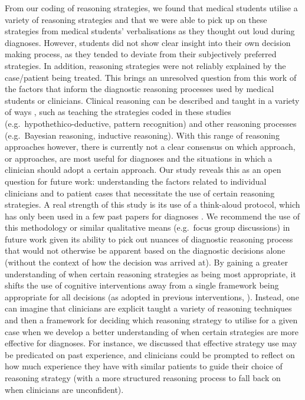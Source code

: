 \documentclass[a4paper, nobind]{templates/ociamthesis}
\begin{document}
From our coding of reasoning strategies, we found that medical students utilise a variety of reasoning strategies and that we were able to pick up on these strategies from medical students' verbalisations as they thought out loud during diagnoses. However, students did not show clear insight into their own decision making process, as they tended to deviate from their subjectively preferred strategies. In addition, reasoning strategies were not reliably explained by the case/patient being treated. This brings an unresolved question from this work of the factors that inform the diagnostic reasoning processes used by medical students or clinicians. Clinical reasoning can be described and taught in a variety of ways \autocite{royce_teaching_2019}, such as teaching the strategies coded in these studies (e.g.~hypothethico-deductive, pattern recognition) and other reasoning processes (e.g.~Bayesian reasoning, inductive reasoning). With this range of reasoning approaches however, there is currently not a clear consensus on which approach, or approaches, are most useful for diagnoses and the situations in which a clinician should adopt a certain approach. Our study reveals this as an open question for future work: understanding the factors related to individual clinicians and to patient cases that necessitate the use of certain reasoning strategies. A real strength of this study is its use of a think-aloud protocol, which has only been used in a few past papers for diagnoses \autocite{arocha_novice_1995,coderre_diagnostic_2003}. We recommend the use of this methodology or similar qualitative means (e.g.~focus group discussions) in future work given its ability to pick out nuances of diagnostic reasoning process that would not otherwise be apparent based on the diagnostic decisions alone (without the context of how the decision was arrived at). By gaining a greater understanding of when certain reasoning strategies as being most appropriate, it shifts the use of cognitive interventions away from a single framework being appropriate for all decisions (as adopted in previous interventions, \autocite{graber_cognitive_2012,lambe_dual-process_2016}). Instead, one can imagine that clinicians are explicit taught a variety of reasoning techniques and then a framework for deciding which reasoning strategy to utilise for a given case when we develop a better understanding of when certain strategies are more effective for diagnoses. For instance, we discussed that effective strategy use may be predicated on past experience, and clinicians could be prompted to reflect on how much experience they have with similar patients to guide their choice of reasoning strategy (with a more structured reasoning process to fall back on when clinicians are unconfident).
\end{document}
